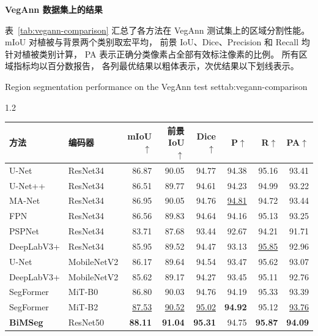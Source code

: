 \medskip\noindent\textbf{VegAnn 数据集上的结果}\par
\label{sec:exp-vegann}

表~\ref{tab:vegann-comparison} 汇总了各方法在 VegAnn
测试集上的区域分割性能。
mIoU 对植被与背景两个类别取宏平均，
前景 IoU、Dice、Precision 和 Recall
均针对植被类别计算，
PA 表示正确分类像素占全部有效标注像素的比例。
所有区域指标均以百分数报告，
各列最优结果以粗体表示，次优结果以下划线表示。


\begin{table}[!htb]
  \centering
    {Region segmentation performance on the VegAnn test set}{tab:vegann-comparison}
  \begin{spacing}{1.2}
    \small
    \setlength{\tabcolsep}{2pt}
    \renewcommand{\arraystretch}{1.15}
    \begin{tabular*}{\linewidth}{@{\extracolsep{\fill}}llrrrrrr@{}}
      \toprule
      方法 & 编码器 & mIoU\(\uparrow\) & 前景 IoU\(\uparrow\)
        & Dice\(\uparrow\) & P\(\uparrow\) & R\(\uparrow\) & PA\(\uparrow\) \\
      \midrule
      U-Net & ResNet34 & 86.87 & 90.05 & 94.77 & 94.38 & 95.16 & 93.41 \\
      U-Net++ & ResNet34 & 86.51 & 89.77 & 94.61 & 94.23 & 94.99 & 93.22 \\
      MA-Net & ResNet34 & 86.95 & 90.05 & 94.76 & \underline{94.81} & 94.72 & 93.44 \\
      FPN & ResNet34 & 86.56 & 89.83 & 94.64 & 94.16 & 95.13 & 93.25 \\
      PSPNet & ResNet34 & 83.71 & 87.68 & 93.44 & 92.67 & 94.21 & 91.71 \\
      DeepLabV3+ & ResNet34 & 85.95 & 89.52 & 94.47 & 93.13 & \underline{95.85} & 92.96 \\
      U-Net & MobileNetV2 & 86.17 & 89.64 & 94.54 & 93.47 & 95.62 & 93.07 \\
      DeepLabV3+ & MobileNetV2 & 85.62 & 89.17 & 94.27 & 93.45 & 95.11 & 92.76 \\
      SegFormer & MiT-B0 & 86.80 & 90.03 & 94.76 & 94.19 & 95.33 & 93.39 \\
      SegFormer & MiT-B2 & \underline{87.53} & \underline{90.52}
        & \underline{95.02} & \textbf{94.92} & 95.12 & \underline{93.76} \\
      \midrule
      \textbf{BiMSeg} & ResNet50 & \textbf{88.11} & \textbf{91.04}
        & \textbf{95.31} & 94.75 & \textbf{95.87} & \textbf{94.09} \\

\end{tabular*}
\end{spacing}
\end{table}

